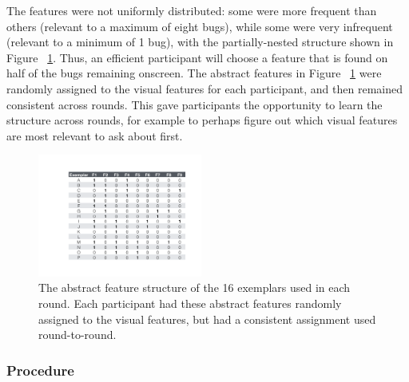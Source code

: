 \documentclass[10pt,letterpaper]{article}
\begin{document}
The features were not uniformly distributed: some were more frequent than others 
(relevant to a maximum of eight bugs), while some were very infrequent (relevant to 
a minimum of 1 bug), with the partially-nested structure shown in Figure~
\ref{fig:feature_table}. Thus, an efficient participant will choose a feature that is 
found on half of the bugs remaining onscreen. The abstract features in Figure~
\ref{fig:feature_table} were randomly assigned to the visual features for each 
participant, and then remained consistent across rounds. This gave participants the 
opportunity to learn the structure across rounds, for example to perhaps figure out 
which visual features are most relevant to ask about first.

\begin{figure}[h]
  \centering
  \includegraphics[width=0.48\textwidth]{figures/feature_table}
  \caption{The abstract feature structure of the 16 exemplars used in each round. 
Each participant had these abstract features randomly assigned to the visual 
features, but had a consistent assignment used round-to-round.}
  \label{fig:feature_table}
\end{figure} 

\subsubsection{Procedure}
\end{document}
